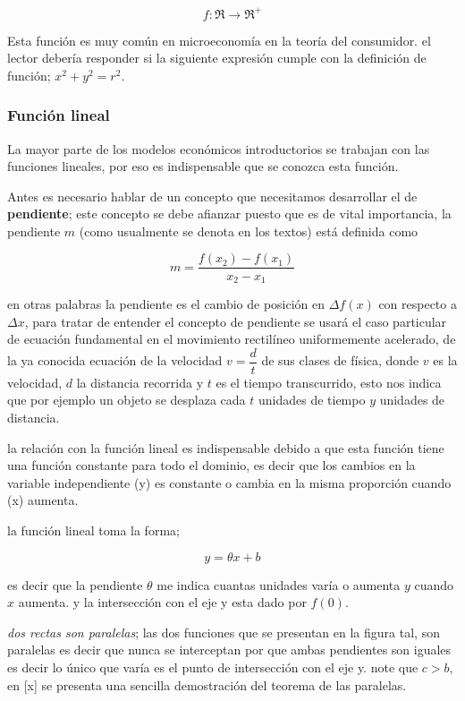 \documentclass[12pt]{article}
\begin{document}
$$f:\Re \longrightarrow \Re^{+}$$

Esta función es muy común en microeconomía en la teoría del consumidor. el lector debería responder si la siguiente expresión cumple con la definición de función; $x^{2}+y^{2}=r^{2}$.

\subsubsection{Función lineal}

La mayor parte de los modelos económicos introductorios se trabajan con las funciones lineales, por eso es indispensable que se conozca esta función.

Antes es necesario hablar de un concepto que necesitamos desarrollar el de \textbf{pendiente}; este concepto se debe afianzar puesto que es de vital  importancia, la pendiente $m$ (como usualmente se denota en los textos) está definida como 

$$ m = \dfrac{f(x_{2})-f(x_{1})}{x_{2}-x_{1}}$$


en otras palabras la pendiente es el cambio de posición en $\Delta f(x)$ con respecto a $\Delta x$, para tratar de entender el concepto de pendiente se usará el caso particular de ecuación fundamental en el movimiento rectilíneo uniformemente acelerado, de la ya conocida ecuación de la velocidad $v=\dfrac{d}{t}$ de sus clases de física, donde $v$ es la velocidad, $d$ la distancia recorrida y $t$ es el tiempo transcurrido, esto nos indica que por ejemplo un objeto se desplaza cada $t$ unidades de tiempo $y$  unidades de distancia.


la relación con la función lineal es indispensable debido a que esta función tiene una función constante para todo el dominio, es decir que los cambios en la variable independiente (y) es constante o cambia en la misma proporción cuando (x) aumenta.


la función lineal toma la forma;

$$y=\theta x+ b$$

es decir que la pendiente $\theta$ me indica cuantas unidades varía o aumenta $y$ cuando $x$	 aumenta.  y la intersección con el eje y esta dado por $f(0)$.

\textit{dos rectas son paralelas}; las dos funciones que se presentan en la figura tal, son paralelas es decir que nunca se interceptan por que ambas pendientes son iguales es decir lo único que varía es el punto de intersección con el eje y. note que $c>b$, en [x] se presenta una sencilla demostración  del teorema de las paralelas.
\end{document}
